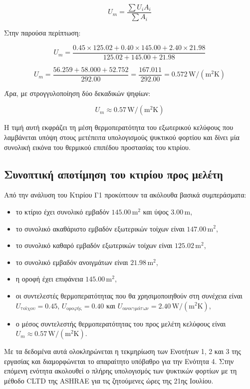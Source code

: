 \documentclass[12pt,a4paper]{article}
\begin{document}
\[
U_m = \frac{\sum U_i A_i}{\sum A_i}
\]

Στην παρούσα περίπτωση:

\[
U_m =
\frac{
0.45 \times 125.02 +
0.40 \times 145.00 +
2.40 \times 21.98
}{
125.02 + 145.00 + 21.98
}
\]

\[
U_m =
\frac{56.259 + 58.000 + 52.752}{292.00}
=
\frac{167.011}{292.00}
=
0.572\,\mathrm{W/(m^2K)}
\]

Άρα, με στρογγυλοποίηση δύο δεκαδικών ψηφίων:

\[
\boxed{U_m \approx 0.57\,\mathrm{W/(m^2K)}}
\]

Η τιμή αυτή εκφράζει τη μέση θερμοπερατότητα του εξωτερικού κελύφους που λαμβάνεται
υπόψη στους μετέπειτα υπολογισμούς ψυκτικού φορτίου και δίνει μία συνολική εικόνα του
θερμικού επιπέδου προστασίας του κτιρίου.

\subsection{Συνοπτική αποτίμηση του κτιρίου προς μελέτη}

Από την ανάλυση του Κτιρίου Γ1 προκύπτουν τα ακόλουθα βασικά συμπεράσματα:

\begin{itemize}
\item το κτίριο έχει συνολικό εμβαδόν \(145.00\,\mathrm{m^2}\) και ύψος \(3.00\,\mathrm{m}\),
\item το συνολικό ακαθάριστο εμβαδόν εξωτερικών τοίχων είναι \(147.00\,\mathrm{m^2}\),
\item το συνολικό καθαρό εμβαδόν εξωτερικών τοίχων είναι \(125.02\,\mathrm{m^2}\),
\item το συνολικό εμβαδόν ανοιγμάτων είναι \(21.98\,\mathrm{m^2}\),
\item η οροφή έχει επιφάνεια \(145.00\,\mathrm{m^2}\),
\item οι συντελεστές θερμοπερατότητας που θα χρησιμοποιηθούν στη συνέχεια είναι
\(U_{\text{τοίχου}} = 0.45\), \(U_{\text{οροφής}} = 0.40\) και
\(U_{\text{ανοιγμάτων}} = 2.40\,\mathrm{W/(m^2K)}\),
\item ο μέσος συντελεστής θερμοπερατότητας του προς μελέτη κελύφους είναι
\(U_m \approx 0.57\,\mathrm{W/(m^2K)}\).
\end{itemize}

Με τα δεδομένα αυτά ολοκληρώνεται η τεκμηρίωση των Ενοτήτων 1, 2 και 3 της
εργασίας και διαμορφώνεται το απαραίτητο υπόβαθρο για την Ενότητα 4. Στην
επόμενη ενότητα ακολουθεί ο πλήρης υπολογισμός των ψυκτικών φορτίων με τη μέθοδο
\textenglish{CLTD} της \textenglish{ASHRAE} για τις ζητούμενες ώρες της 21ης Ιουλίου.
\end{document}
